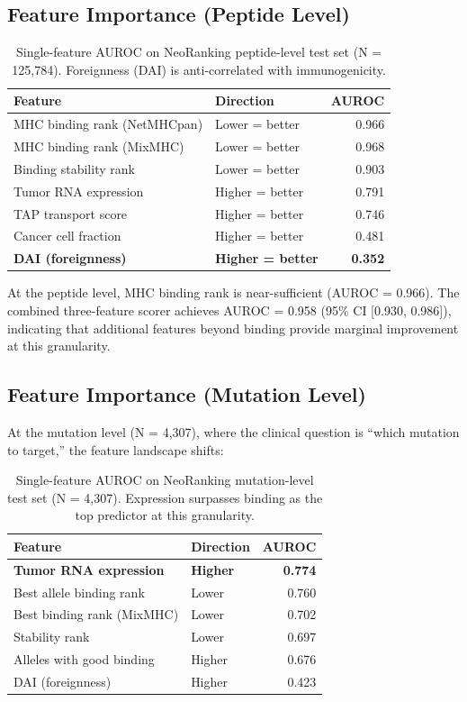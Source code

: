 \documentclass[11pt,twocolumn]{article}
\begin{document}
\subsection{Feature Importance (Peptide Level)}

\begin{table}[ht]
\centering
\small
\begin{tabular}{@{}llr@{}}
\toprule
Feature & Direction & AUROC \\
\midrule
MHC binding rank (NetMHCpan) & Lower = better & 0.966 \\
MHC binding rank (MixMHC) & Lower = better & 0.968 \\
Binding stability rank & Lower = better & 0.903 \\
Tumor RNA expression & Higher = better & 0.791 \\
TAP transport score & Higher = better & 0.746 \\
Cancer cell fraction & Higher = better & 0.481 \\
\textbf{DAI (foreignness)} & \textbf{Higher = better} & \textbf{0.352} \\
\bottomrule
\end{tabular}
\caption{Single-feature AUROC on NeoRanking peptide-level test set (N = 125,784). Foreignness (DAI) is anti-correlated with immunogenicity.}
\end{table}

At the peptide level, MHC binding rank is near-sufficient (AUROC = 0.966). The combined three-feature scorer achieves AUROC = 0.958 (95\% CI [0.930, 0.986]), indicating that additional features beyond binding provide marginal improvement at this granularity.

\subsection{Feature Importance (Mutation Level)}

At the mutation level (N = 4,307), where the clinical question is ``which mutation to target,'' the feature landscape shifts:

\begin{table}[ht]
\centering
\small
\begin{tabular}{@{}llr@{}}
\toprule
Feature & Direction & AUROC \\
\midrule
\textbf{Tumor RNA expression} & \textbf{Higher} & \textbf{0.774} \\
Best allele binding rank & Lower & 0.760 \\
Best binding rank (MixMHC) & Lower & 0.702 \\
Stability rank & Lower & 0.697 \\
Alleles with good binding & Higher & 0.676 \\
DAI (foreignness) & Higher & 0.423 \\
\bottomrule
\end{tabular}
\caption{Single-feature AUROC on NeoRanking mutation-level test set (N = 4,307). Expression surpasses binding as the top predictor at this granularity.}
\end{table}
\end{document}
